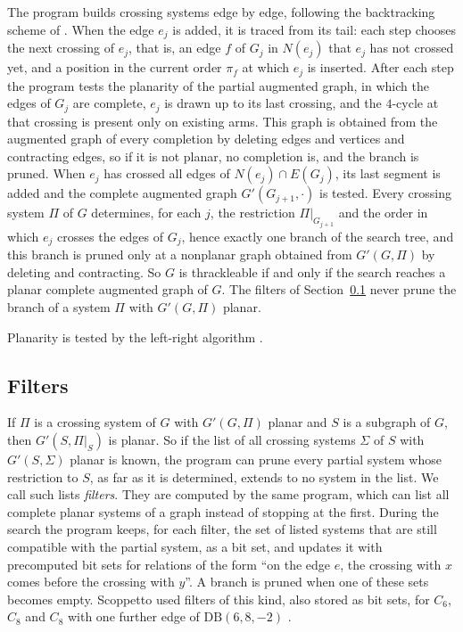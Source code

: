\documentclass[11pt]{amsart}
\theoremstyle{definition}
\theoremstyle{remark}
\numberwithin{equation}{section}
\newcommand{\DB}{\mathrm{DB}}
\begin{document}
The program builds crossing systems edge by edge, following the backtracking scheme of \cite[Appendix~A]{FP11}. When the edge $e_j$ is added, it is traced from its tail: each step chooses the next crossing of $e_j$, that is, an edge $f$ of $G_j$ in $N(e_j)$ that $e_j$ has not crossed yet, and a position in the current order $\pi_f$ at which $e_j$ is inserted. After each step the program tests the planarity of the partial augmented graph, in which the edges of $G_j$ are complete, $e_j$ is drawn up to its last crossing, and the $4$-cycle at that crossing is present only on existing arms. This graph is obtained from the augmented graph of every completion by deleting edges and vertices and contracting edges, so if it is not planar, no completion is, and the branch is pruned. When $e_j$ has crossed all edges of $N(e_j)\cap E(G_j)$, its last segment is added and the complete augmented graph $G'(G_{j+1},\cdot)$ is tested. Every crossing system $\Pi$ of $G$ determines, for each $j$, the restriction $\Pi|_{G_{j+1}}$ and the order in which $e_j$ crosses the edges of $G_j$, hence exactly one branch of the search tree, and this branch is pruned only at a nonplanar graph obtained from $G'(G,\Pi)$ by deleting and contracting. So $G$ is thrackleable if and only if the search reaches a planar complete augmented graph of $G$. The filters of Section~\ref{sec:filters} never prune the branch of a system $\Pi$ with $G'(G,\Pi)$ planar.

Planarity is tested by the left-right algorithm \cite{dFOR06,Bra09}.

\subsection{Filters}\label{sec:filters}
If $\Pi$ is a crossing system of $G$ with $G'(G,\Pi)$ planar and $S$ is a subgraph of $G$, then $G'(S,\Pi|_S)$ is planar. So if the list of all crossing systems $\Sigma$ of $S$ with $G'(S,\Sigma)$ planar is known, the program can prune every partial system whose restriction to $S$, as far as it is determined, extends to no system in the list. We call such lists \emph{filters}. They are computed by the same program, which can list all complete planar systems of a graph instead of stopping at the first. During the search the program keeps, for each filter, the set of listed systems that are still compatible with the partial system, as a bit set, and updates it with precomputed bit sets for relations of the form ``on the edge $e$, the crossing with $x$ comes before the crossing with $y$''. A branch is pruned when one of these sets becomes empty. Scoppetto used filters of this kind, also stored as bit sets, for $C_6$, $C_8$ and $C_8$ with one further edge of $\DB(6,8,-2)$ \cite[Section~4]{Sco26}.
\end{document}
